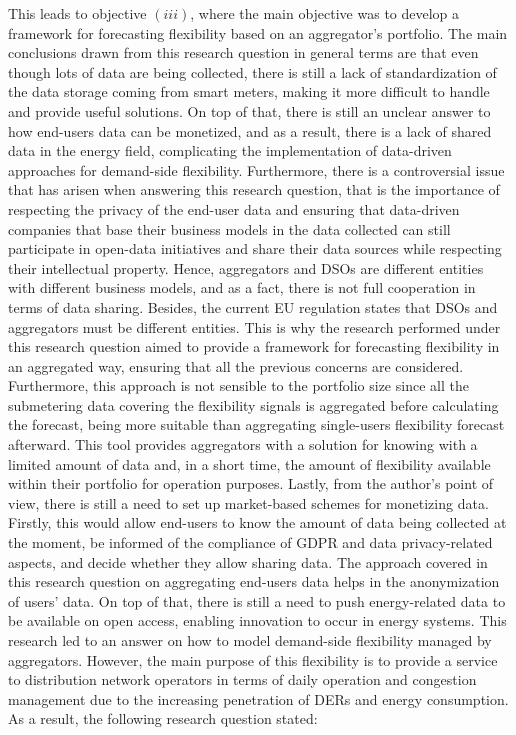 This leads to objective $(iii)$, where the main objective was to develop a framework for forecasting flexibility based on an aggregator's portfolio. The main conclusions drawn from this research question in general terms are that even though lots of data are being collected, there is still a lack of standardization of the data storage coming from smart meters, making it more difficult to handle and provide useful solutions. On top of that, there is still an unclear answer to how end-users data can be monetized, and as a result, there is a lack of shared data in the energy field, complicating the implementation of data-driven approaches for demand-side flexibility. Furthermore, there is a controversial issue that has arisen when answering this research question, that is the importance of respecting the privacy of the end-user data and ensuring that data-driven companies that base their business models in the data collected can still participate in open-data initiatives and share their data sources while respecting their intellectual property. Hence, aggregators and DSOs are different entities with different business models, and as a fact, there is not full cooperation in terms of data sharing. Besides, the current EU regulation states that DSOs and aggregators must be different entities. This is why the research performed under this research question aimed to provide a framework for forecasting flexibility in an aggregated way, ensuring that all the previous concerns are considered. Furthermore, this approach is not sensible to the portfolio size since all the submetering data covering the flexibility signals is aggregated before calculating the forecast, being more suitable than aggregating single-users flexibility forecast afterward. This tool provides aggregators with a solution for knowing with a limited amount of data and, in a short time, the amount of flexibility available within their portfolio for operation purposes. Lastly, from the author's point of view, there is still a need to set up market-based schemes for monetizing data. Firstly, this would allow end-users to know the amount of data being collected at the moment, be informed of the compliance of GDPR and data privacy-related aspects, and decide whether they allow sharing data.  The approach covered in this research question on aggregating end-users data helps in the anonymization of users' data. On top of that, there is still a need to push energy-related data to be available on open access, enabling innovation to occur in energy systems. 
This research led to an answer on how to model demand-side flexibility managed by aggregators. However, the main purpose of this flexibility is to provide a service to distribution network operators in terms of daily operation and congestion management due to the increasing penetration of DERs and energy consumption. As a result, the following research question stated: 


